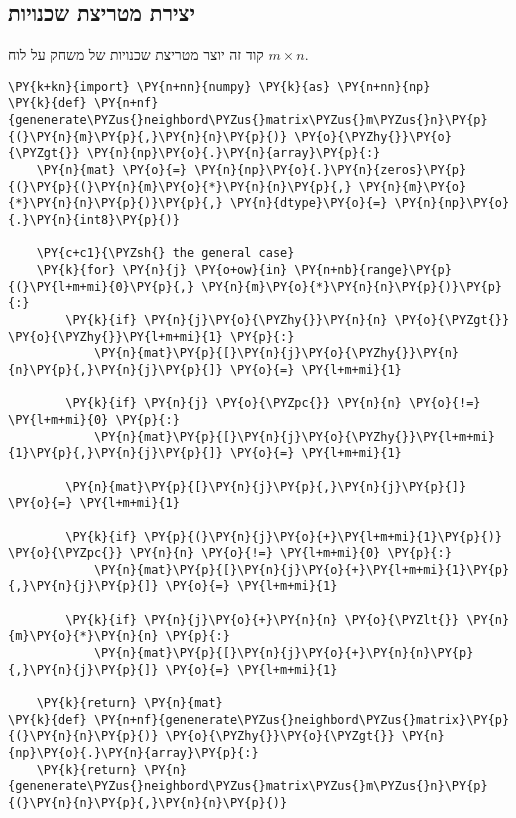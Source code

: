 \hypertarget{generate-matrix}{%
\subsection{יצירת מטריצת שכנויות}\label{generate-matrix}}
קוד זה יוצר מטריצת שכנויות של משחק על לוח 
$m \times n$.
\begin{english}
    \begin{tcolorbox}[breakable, size=fbox, boxrule=1pt, pad at break*=1mm,colback=cellbackground, colframe=cellborder]
\begin{Verbatim}[commandchars=\\\{\}]
\PY{k+kn}{import} \PY{n+nn}{numpy} \PY{k}{as} \PY{n+nn}{np}
\PY{k}{def} \PY{n+nf}{genenerate\PYZus{}neighbord\PYZus{}matrix\PYZus{}m\PYZus{}n}\PY{p}{(}\PY{n}{m}\PY{p}{,}\PY{n}{n}\PY{p}{)} \PY{o}{\PYZhy{}}\PY{o}{\PYZgt{}} \PY{n}{np}\PY{o}{.}\PY{n}{array}\PY{p}{:}
    \PY{n}{mat} \PY{o}{=} \PY{n}{np}\PY{o}{.}\PY{n}{zeros}\PY{p}{(}\PY{p}{(}\PY{n}{m}\PY{o}{*}\PY{n}{n}\PY{p}{,} \PY{n}{m}\PY{o}{*}\PY{n}{n}\PY{p}{)}\PY{p}{,} \PY{n}{dtype}\PY{o}{=} \PY{n}{np}\PY{o}{.}\PY{n}{int8}\PY{p}{)}

    \PY{c+c1}{\PYZsh{} the general case}
    \PY{k}{for} \PY{n}{j} \PY{o+ow}{in} \PY{n+nb}{range}\PY{p}{(}\PY{l+m+mi}{0}\PY{p}{,} \PY{n}{m}\PY{o}{*}\PY{n}{n}\PY{p}{)}\PY{p}{:}
        \PY{k}{if} \PY{n}{j}\PY{o}{\PYZhy{}}\PY{n}{n} \PY{o}{\PYZgt{}} \PY{o}{\PYZhy{}}\PY{l+m+mi}{1} \PY{p}{:}
            \PY{n}{mat}\PY{p}{[}\PY{n}{j}\PY{o}{\PYZhy{}}\PY{n}{n}\PY{p}{,}\PY{n}{j}\PY{p}{]} \PY{o}{=} \PY{l+m+mi}{1}

        \PY{k}{if} \PY{n}{j} \PY{o}{\PYZpc{}} \PY{n}{n} \PY{o}{!=} \PY{l+m+mi}{0} \PY{p}{:}
            \PY{n}{mat}\PY{p}{[}\PY{n}{j}\PY{o}{\PYZhy{}}\PY{l+m+mi}{1}\PY{p}{,}\PY{n}{j}\PY{p}{]} \PY{o}{=} \PY{l+m+mi}{1}

        \PY{n}{mat}\PY{p}{[}\PY{n}{j}\PY{p}{,}\PY{n}{j}\PY{p}{]} \PY{o}{=} \PY{l+m+mi}{1}

        \PY{k}{if} \PY{p}{(}\PY{n}{j}\PY{o}{+}\PY{l+m+mi}{1}\PY{p}{)} \PY{o}{\PYZpc{}} \PY{n}{n} \PY{o}{!=} \PY{l+m+mi}{0} \PY{p}{:}
            \PY{n}{mat}\PY{p}{[}\PY{n}{j}\PY{o}{+}\PY{l+m+mi}{1}\PY{p}{,}\PY{n}{j}\PY{p}{]} \PY{o}{=} \PY{l+m+mi}{1}

        \PY{k}{if} \PY{n}{j}\PY{o}{+}\PY{n}{n} \PY{o}{\PYZlt{}} \PY{n}{m}\PY{o}{*}\PY{n}{n} \PY{p}{:}
            \PY{n}{mat}\PY{p}{[}\PY{n}{j}\PY{o}{+}\PY{n}{n}\PY{p}{,}\PY{n}{j}\PY{p}{]} \PY{o}{=} \PY{l+m+mi}{1}
    
    \PY{k}{return} \PY{n}{mat}
\PY{k}{def} \PY{n+nf}{genenerate\PYZus{}neighbord\PYZus{}matrix}\PY{p}{(}\PY{n}{n}\PY{p}{)} \PY{o}{\PYZhy{}}\PY{o}{\PYZgt{}} \PY{n}{np}\PY{o}{.}\PY{n}{array}\PY{p}{:}   
    \PY{k}{return} \PY{n}{genenerate\PYZus{}neighbord\PYZus{}matrix\PYZus{}m\PYZus{}n}\PY{p}{(}\PY{n}{n}\PY{p}{,}\PY{n}{n}\PY{p}{)}


\end{Verbatim}
\end{tcolorbox}
\end{english}
